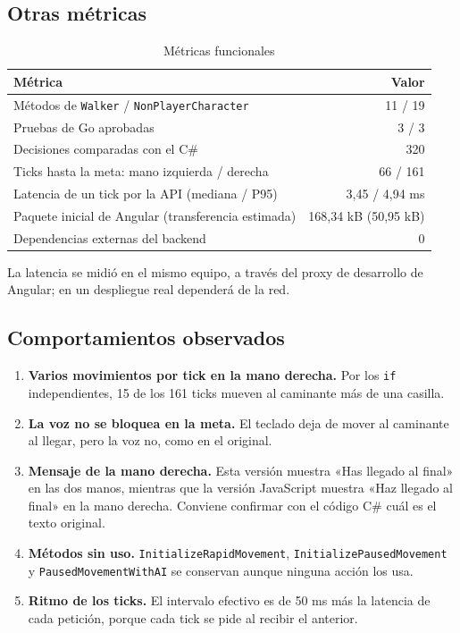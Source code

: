 \documentclass[12pt,a4paper]{article}
\begin{document}
\subsection{Otras métricas}
\begin{table}[H]
\centering\small
\caption{Métricas funcionales}
\begin{tabular}{p{7.8cm}r}
\toprule Métrica & Valor\\\midrule
Métodos de \texttt{Walker} / \texttt{NonPlayerCharacter} & 11 / 19\\
Pruebas de Go aprobadas & 3 / 3\\
Decisiones comparadas con el C\# & 320\\
Ticks hasta la meta: mano izquierda / derecha & 66 / 161\\
Latencia de un tick por la API (mediana / P95) & 3,45 / 4,94 ms\\
Paquete inicial de Angular (transferencia estimada) & 168,34 kB (50,95 kB)\\
Dependencias externas del backend & 0\\
\bottomrule
\end{tabular}
\end{table}
La latencia se midió en el mismo equipo, a través del proxy de desarrollo de
Angular; en un despliegue real dependerá de la red.

\subsection{Comportamientos observados}\label{sec:hallazgos}
\begin{enumerate}
  \item \textbf{Varios movimientos por tick en la mano derecha.} Por los \texttt{if}
        independientes, 15 de los 161 ticks mueven al caminante más de una casilla.
  \item \textbf{La voz no se bloquea en la meta.} El teclado deja de mover al
        caminante al llegar, pero la voz no, como en el original.
  \item \textbf{Mensaje de la mano derecha.} Esta versión muestra «Has llegado al
        final» en las dos manos, mientras que la versión JavaScript muestra
        «Haz llegado al final» en la mano derecha. Conviene confirmar con el
        código C\# cuál es el texto original.
  \item \textbf{Métodos sin uso.} \texttt{InitializeRapidMovement},
        \texttt{InitializePausedMovement} y \texttt{PausedMovementWithAI} se
        conservan aunque ninguna acción los usa.
  \item \textbf{Ritmo de los ticks.} El intervalo efectivo es de 50 ms más la
        latencia de cada petición, porque cada tick se pide al recibir el anterior.
\end{enumerate}
\end{document}
